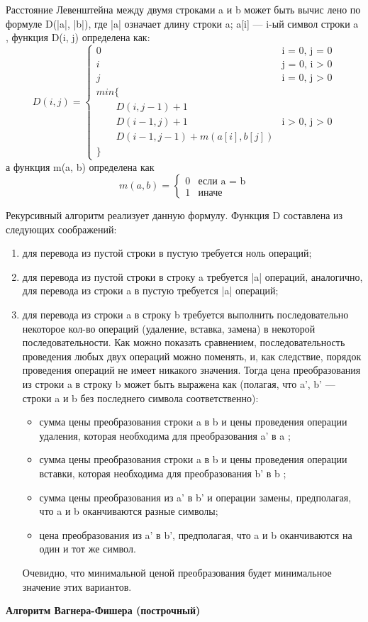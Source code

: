 \documentclass[a4paper,12pt]{article}
\begin{document}
Расстояние Левенштейна между двумя строками a и b может быть вычис лено по формуле D(|a|, |b|), где |a| означает длину строки a; a[i] --- i-ый символ строки a , функция D(i, j) определена как:
\begin{equation}
\label{eq:D}
D(i, j) = 
 \begin{cases}
   0 &\text{i = 0, j = 0}\\
   i &\text{j = 0, i > 0}\\
   j &\text{i = 0, j > 0}\\
   min \lbrace \\
   \qquad D(i, j-1) + 1\\
   \qquad D(i-1, j) + 1 &\text{i > 0, j > 0}\\
   \qquad D(i-1, j-1) + m(a[i], b[j])\\
   \rbrace
 \end{cases}
\end{equation}
а функция m(a, b) определена как
\begin{equation}
m(a, b) = 
 \begin{cases}
   0 &\text{если a = b}\\
   1 &\text{иначе}
 \end{cases}
\end{equation}

Рекурсивный алгоритм реализует данную формулу.
Функция D составлена из следующих соображений:
\begin{enumerate}
\item для перевода из пустой строки в пустую требуется ноль операций; 
\item для перевода из пустой строки в строку a требуется |a| операций, аналогично, для перевода из строки a в пустую требуется |a| операций;
\item для перевода из строки a в строку b требуется выполнить последовательно некоторое кол-во операций (удаление, вставка, замена) в некоторой последовательности. Как можно показать сравнением, последовательность проведения любых двух операций можно поменять, и, как следствие, порядок проведения операций не имеет никакого значения. Тогда цена преобразования из строки a в строку b может быть выражена как (полагая, что a', b'  — строки a и b без последнего символа
соответственно):
\begin{itemize}
\item сумма цены преобразования строки a в b и цены проведения операции удаления, которая необходима для преобразования a' в a ;
\item сумма цены преобразования строки a в b  и цены проведения операции вставки, которая необходима для преобразования b' в b ;
\item сумма цены преобразования из a' в b' и операции замены, предполагая, что a и b оканчиваются разные символы;
\item цена преобразования из a' в b', предполагая, что a и b оканчиваются на один и тот же символ.
\end{itemize}
Очевидно, что минимальной ценой преобразования будет минимальное
значение этих вариантов.
\end{enumerate}
\textbf{Алгоритм Вагнера-Фишера (построчный)}
\end{document}
